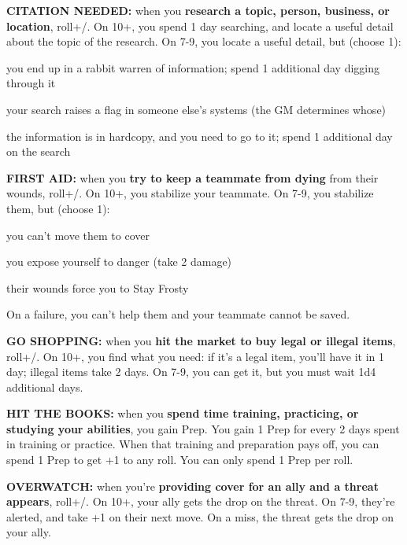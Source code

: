 \documentclass[oneside,10pt]{article}
\begin{document}
\begin{multicols}{2}
\label{move_citationneeded}
\textbf{CITATION NEEDED:} when you \textbf{research a topic, person,
business, or location}, roll+\mastery/. On 10+, you spend 1 day
searching, and locate a useful detail about the topic of the
research. On 7-9, you locate a useful detail, but
(choose 1):
\begin{dent}

\tcirc{} you end up in a rabbit warren of information; spend 1
additional day digging through it

\tcirc{} your search raises a flag in someone else’s systems (the
GM determines whose)

\tcirc{} the information is in hardcopy, and you need to go to it;
spend 1 additional day on the search
\end{dent}

\label{move_firstaid}
\textbf{FIRST AID:} when you \textbf{try to keep a teammate from dying}
from their wounds, roll+\mastery/. On 10+, you stabilize your
teammate. On 7-9, you stabilize them, but (choose
1):
\begin{dent}

\tcirc{} you can’t move them to cover

\tcirc{} you expose yourself to danger (take 2
damage)

\tcirc{} their wounds force you to Stay Frosty
\end{dent}

On a failure, you can't help them and your teammate cannot be saved.

\label{move_goshopping}
\textbf{GO SHOPPING:} when you \textbf{hit the market to buy legal or
  illegal items}, roll+\flair/. On 10+, you find what you need: if
it’s a legal item, you’ll have it in 1 day; illegal items take 2
days. On 7-9, you can get it, but you must wait 1d4 additional days.

\label{move_hitthebooks}
\textbf{HIT THE BOOKS:} when you \textbf{spend time training,
  practicing, or studying your abilities}, you gain Prep. You gain 1
Prep for every 2 days spent in training or practice. When that
training and preparation pays off, you can spend 1 Prep to get +1 to
any roll. You can only spend 1 Prep per roll.

\label{move_overwatch}
\textbf{OVERWATCH:} when you’re \textbf{providing cover for an ally
  and a threat appears}, roll+\twitch/. On 10+, your ally gets the
drop on the threat. On 7-9, they’re alerted, and take +1 on their next
move. On a miss, the threat gets the drop on your ally.


\end{multicols}
\end{document}
